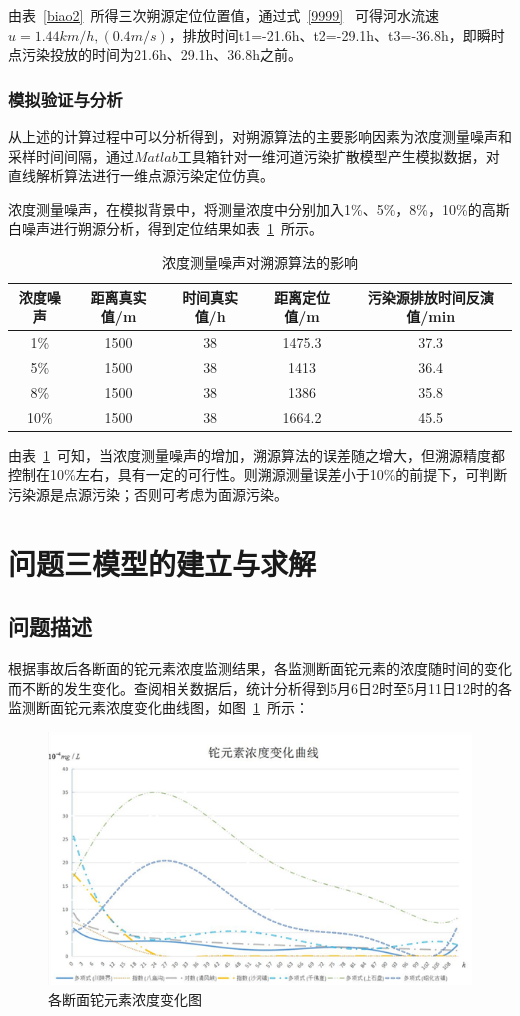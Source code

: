 \documentclass{whutmod}
\begin{document}
由表~\ref{biao2}~所得三次朔源定位位置值，通过式~\ref{9999}~
可得河水流速$u=1.44km/h, (0.4m/s)$，排放时间t1=-21.6h、t2=-29.1h、t3=-36.8h，即瞬时点污染投放的时间为21.6h、29.1h、36.8h之前。

\subsubsection{模拟验证与分析}
 从上述的计算过程中可以分析得到，对朔源算法的主要影响因素为浓度测量噪声和采样时间间隔，通过$Matlab$工具箱针对一维河道污染扩散模型产生模拟数据，对直线解析算法进行一维点源污染定位仿真。

 浓度测量噪声，在模拟背景中，将测量浓度中分别加入1\%、5\%，8\%，10\%的高斯白噪声进行朔源分析，得到定位结果如表~\ref{gsbz}~所示。
		\begin{table}[H]
		\caption{浓度测量噪声对溯源算法的影响}\label{gsbz} \centering
		\begin{tabular}{ccccc}
			\toprule[1.5pt]
			浓度噪声&距离真实值/m&时间真实值/h&距离定位值/m&污染源排放时间反演值/min \\
			\midrule[1pt]
			1\% &1500&38&1475.3&37.3\\
			5\%&1500 &38&1413&36.4\\
			8\% &1500&38&1386&35.8\\
			10\% &1500&38&1664.2&45.5\\
			\bottomrule[1.5pt]
		\end{tabular}
	\end{table}
	由表~\ref{gsbz}~可知，当浓度测量噪声的增加，溯源算法的误差随之增大，但溯源精度都控制在10\%左右，具有一定的可行性。则溯源测量误差小于10\%的前提下，可判断污染源是点源污染；否则可考虑为面源污染。


	\section{问题三模型的建立与求解}
	
	
	\subsection{问题描述}

根据事故后各断面的铊元素浓度监测结果，各监测断面铊元素的浓度随时间的变化而不断的发生变化。查阅相关数据后，统计分析得到5月6日2时至5月11日12时的各监测断面铊元素浓度变化曲线图，如图~\ref{tu}~所示：
				\begin{figure}[H]
		\centering
		\includegraphics[width=.8\textwidth]{figures/tu.png}
		\caption{各断面铊元素浓度变化图}\label{tu}
	\end{figure}
\end{document}
